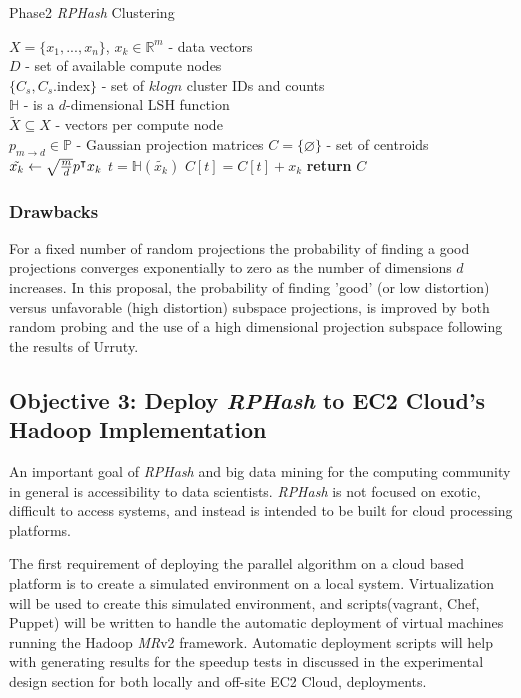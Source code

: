 \documentclass[a4paper,10pt]{article}
\begin{document}
%
\begin{algorithm}
\caption{Phase2 \emph{RPHash} Clustering}\label{Phase2}
\begin{algorithmic}[1]
\REQUIRE $X=\{x_1,...,x_n\}$, $x_k \in \mathbb{R}^m$ - data vectors\\
$D$ - set of available compute nodes\\
$\{C_s,C_s.$index$\}$ - set of $klogn$ cluster IDs and counts\\
$\mathbb{H}$ - is a $d$-dimensional LSH function\\
$\widetilde{X} \subseteq X$ - vectors per compute node\\
$p_{m\rightarrow d}\in \mathbb{P}$ - Gaussian projection matrices
\STATE $C=\{\varnothing\}$ - set of centroids
\STATE $\tilde{x_k}\leftarrow \sqrt{{m}\over{d}}p^{\intercal}x_k $
\STATE $t = \mathbb{H}(\tilde{x_k})$
\STATE $C[t]=C[t]+x_k$
\ENDIF
\ENDFOR
\ENDFOR
\State \textbf{return} ${C}$
\end{algorithmic}
\end{algorithm}
\subsubsection{Drawbacks} For a fixed number of random projections the
probability of finding a good projections converges exponentially to zero as
the number of dimensions $d$ increases\cite{florescu09}.  In this proposal,
the probability of finding 'good' (or low distortion) versus unfavorable
(high distortion) subspace projections, is improved by both random probing
and the use of a high dimensional projection subspace following the results
of Urruty\cite{Urruty2007}.

\subsection{Objective 3: Deploy \emph{RPHash} to EC2 Cloud's Hadoop
Implementation} An important goal of \emph{RPHash} and big data mining for
the computing community in general is accessibility to data scientists.
\emph{RPHash} is not focused on exotic, difficult to access systems, and
instead is intended to be built for cloud processing platforms.

The first requirement of deploying the parallel algorithm on a cloud
based platform is to create a simulated environment on a local system.
Virtualization will be used to create this simulated environment, and
scripts(vagrant, Chef, Puppet) will be written to handle the automatic
deployment of virtual machines running the Hadoop \emph{MR}v2 framework.
Automatic deployment scripts will help with generating results for the speedup
tests in discussed in the experimental design section for both locally and
off-site EC2 Cloud, deployments.
\end{document}
